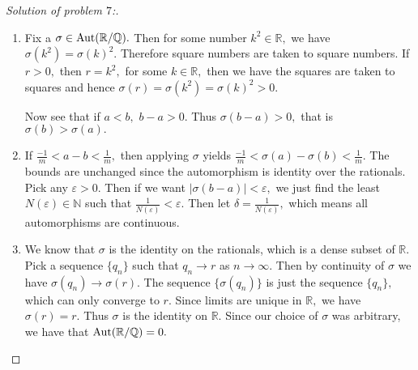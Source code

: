 \documentclass[letterpaper,11pt,twoside]{article}
\theoremstyle{proposition}
\theoremstyle{definition}
\theoremstyle{theorem}
\theoremstyle{definition}
\theoremstyle{definition}
\theoremstyle{definition}
\theoremstyle{lemma}
\theoremstyle{definition}
\theoremstyle{definition}
\theoremstyle{corollary}
\theoremstyle{definition}
\theoremstyle{definition}
\theoremstyle{definition}
\DeclareMathOperator{\Aut}{\text{\rm Aut}}
\begin{document}
	\begin{proof}[Solution of problem $7$:]
	\begin{enumerate}
		\item Fix a $\sigma \in \Aut(\mathbb{R}/\mathbb{Q}).$ Then for some number $k^2 \in \mathbb{R},$ we have $\sigma(k^2)= \sigma(k)^2.$ Therefore 
		square numbers are taken to square numbers. If $r >0,$ then $r=k^2,$ for some $k \in \mathbb{R},$ then we have the squares are taken to squares and 
		hence $\sigma(r)=\sigma(k^2)=\sigma(k)^2 > 0.$
		
		Now see that if $a< b,$ $b-a > 0.$ Thus $\sigma(b-a) >0,$ that is $\sigma(b) > \sigma(a).$ 
		
		\item If $\frac{-1}{m} < a-b < \frac{1}{m},$ then applying $\sigma$ yields $\frac{-1}{m} < \sigma(a) - \sigma(b) < \frac{1}{m}.$ The bounds are 
		unchanged since the automorphism is identity over the rationals. Pick any $\varepsilon > 0.$ Then if we want $|\sigma(b-a)| < \varepsilon,$ we just 
		find the least $N(\varepsilon) \in \mathbb{N}$ such that $\frac{1}{N(\varepsilon)} < \varepsilon.$ Then let $\delta= \frac{1}{N(\varepsilon)},$ 
		which means all automorphisms are continuous. 
		
		\item We know that $\sigma$ is the identity on the rationals, which is a dense subset of $\mathbb{R}.$ Pick a sequence $\{q_n\}$ such that $q_n \to 
		r$ as $n \to \infty.$ Then by continuity of $\sigma$ we have $\sigma(q_n) \to \sigma(r).$ The sequence $\{\sigma(q_n)\}$ is just the sequence 
		$\{q_n\},$ which can only converge to $r.$ Since limits are unique in $\mathbb{R},$ we have $\sigma(r)=r.$ Thus $\sigma$ is the identity on 
		$\mathbb{R}.$ Since our choice of $\sigma$ was arbitrary, we have that $\Aut(\mathbb{R}/\mathbb{Q})=0.$ 
		
		
	\end{enumerate}
\end{proof}
\end{document}
